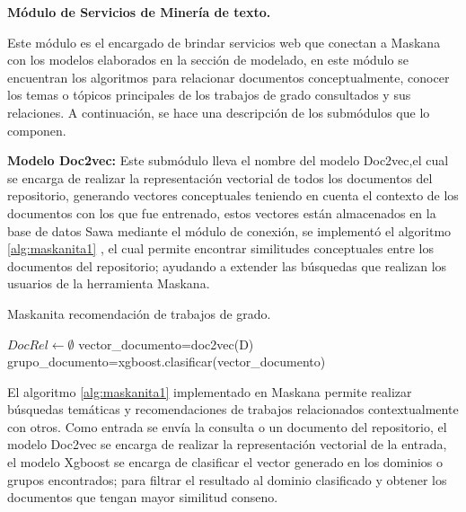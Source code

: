 \textbf{Módulo de Servicios de Minería de texto.}

Este módulo es el encargado de brindar servicios web que conectan a Maskana con los modelos elaborados en la sección de modelado, en este módulo
 se encuentran los algoritmos para relacionar documentos conceptualmente,
 conocer los temas o tópicos principales de los trabajos de grado consultados y sus relaciones.
 A continuación, se hace una descripción de los submódulos que lo componen.

\textbf{Modelo Doc2vec:}
Este submódulo lleva el nombre del modelo Doc2vec,el cual se encarga de realizar la representación vectorial de todos los documentos del repositorio, generando vectores conceptuales teniendo en cuenta el contexto de los documentos con los que fue entrenado, estos vectores están almacenados en la base de datos Sawa mediante el módulo de conexión, 
se implementó el algoritmo \ref{alg:maskanita1} , el cual permite  encontrar similitudes conceptuales entre los documentos del repositorio; ayudando a extender las búsquedas que realizan los usuarios de la herramienta Maskana.

\begin{algorithm}
    \renewcommand{\algorithmicrequire}{\textbf{Input:}}
    \renewcommand{\algorithmicrequire}{\textbf{Input:}}
    \renewcommand{\algorithmicensure}{\textbf{Output:}}
    \renewcommand{\algorithmicprint}{\textbf{break}}
  \caption{ Maskanita recomendación de trabajos de grado.}
  \label{alg:maskanita1}
  \footnotesize
  \begin{algorithmic}[1]
\STATE $DocRel \leftarrow \emptyset$
\STATE vector\_documento=doc2vec(D)
\STATE grupo\_documento=xgboost.clasificar(vector\_documento)
	\ENDIF
\ENDFOR
{}
\end{algorithmic}
\end{algorithm}

El algoritmo \ref{alg:maskanita1} implementado en Maskana permite realizar búsquedas temáticas y recomendaciones de trabajos relacionados contextualmente con otros. 
Como entrada se envía la consulta o un documento del repositorio,
el modelo Doc2vec se encarga de realizar la representación vectorial de la entrada,
el modelo Xgboost se encarga de clasificar el vector generado en los dominios o grupos encontrados; para filtrar el resultado al dominio clasificado y obtener los documentos que tengan  mayor similitud conseno.


